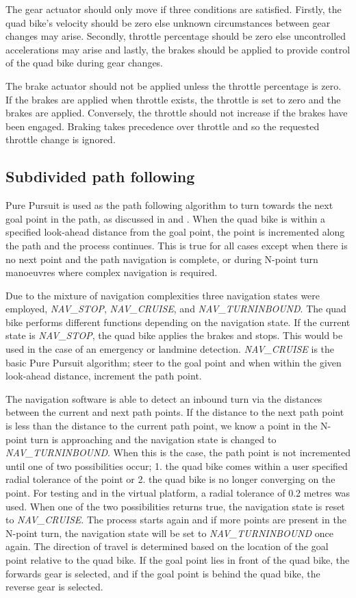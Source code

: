 \documentclass[main.tex]{subfiles}
\begin{document}
The gear actuator should only move if three conditions are satisfied. Firstly, the quad bike's velocity should be zero else unknown circumstances between gear changes may arise. Secondly, throttle percentage should be zero else uncontrolled accelerations may arise and lastly, the brakes should be applied to provide control of the quad bike during gear changes.

The brake actuator should not be applied unless the throttle percentage is zero. If the brakes are applied when throttle exists, the throttle is set to zero and the brakes are applied. Conversely, the throttle should not increase if the brakes have been engaged. Braking takes precedence over throttle and so the requested throttle change is ignored.

\subsection{Subdivided path following}
Pure Pursuit is used as the path following algorithm to turn towards the next goal point in the path, as discussed in  and . When the quad bike is within a specified look-ahead distance from the goal point, the point is incremented along the path and the process continues. This is true for all cases except when there is no next point and the path navigation is complete, or during N-point turn manoeuvres where complex navigation is required.

Due to the mixture of navigation complexities three navigation states were employed, \textit{NAV\_STOP}, \textit{NAV\_CRUISE}, and \textit{NAV\_TURNINBOUND}. The quad bike performs different functions depending on the navigation state. If the current state is \textit{NAV\_STOP}, the quad bike applies the brakes and stops. This would be used in the case of an emergency or landmine detection. \textit{NAV\_CRUISE} is the basic Pure Pursuit algorithm; steer to the goal point and when within the given look-ahead distance, increment the path point.

The navigation software is able to detect an inbound turn via the distances between the current and next path points. If the distance to the next path point is less than the distance to the current path point, we know a point in the N-point turn is approaching and the navigation state is changed to \textit{NAV\_TURNINBOUND}. When this is the case, the path point is not incremented until one of two possibilities occur; 1. the quad bike comes within a user specified radial tolerance of the point or 2. the quad bike is no longer converging on the point. For testing and in the virtual platform, a radial tolerance of 0.2 metres was used. When one of the two possibilities returns true, the navigation state is reset to \textit{NAV\_CRUISE}. The process starts again and if more points are present in the N-point turn, the navigation state will be set to \textit{NAV\_TURNINBOUND} once again. The direction of travel is determined based on the location of the goal point relative to the quad bike. If the goal point lies in front of the quad bike, the forwards gear is selected, and if the goal point is behind the quad bike, the reverse gear is selected.
\end{document}
